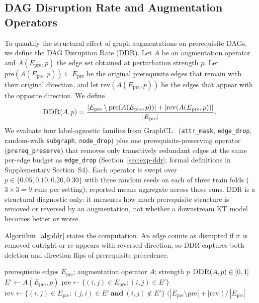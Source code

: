 \documentclass[preprint,10pt,doubleblind]{elsarticle}
\newcommand{\Epre}{\ensuremath{E_{\text{pre}}}}
\newcommand{\DDR}{\textsc{DDR}}
\begin{document}
\subsection{DAG Disruption Rate and Augmentation Operators}
\label{sec:ddr}
To quantify the structural effect of graph augmentations on prerequisite
DAGs, we define the DAG Disruption Rate (\DDR{}). Let $A$ be an
augmentation operator and $A(\Epre,p)$ the edge set obtained at
perturbation strength $p$. Let $\mathrm{pre}(A(\Epre,p))\subseteq\Epre$
be the original prerequisite edges that remain with their original
direction, and let $\mathrm{rev}(A(\Epre,p))$ be the edges that appear
with the opposite direction. We define
\begin{equation}
\DDR(A,p)=
\frac{|\Epre\setminus \mathrm{pre}(A(\Epre,p))|
      +|\mathrm{rev}(A(\Epre,p))|}
     {|\Epre|}.
\label{eq:ddr}
\end{equation}
We evaluate four label-agnostic families from GraphCL~\cite{you2020graphcl}
(\texttt{attr\_mask}, \texttt{edge\_drop}, random-walk \texttt{subgraph},
\texttt{node\_drop}) plus one prerequisite-preserving operator
(\texttt{prereq\_preserve}) that removes only transitively redundant edges at
the same per-edge budget as \texttt{edge\_drop} (Section~\ref{sec:exp-ddr};
formal definitions in Supplementary Section~S4).
Each operator is swept over $p\in\{0.05,0.10,0.20,0.30\}$ with three
random seeds on each of three train folds ($3\times 3=9$ runs per
setting); reported means aggregate across those runs. \DDR{} is a structural diagnostic only: it measures how
much prerequisite structure is removed or reversed by an augmentation,
not whether a downstream KT model becomes better or worse.

Algorithm~\ref{alg:ddr} states the computation. An edge counts as disrupted if
it is removed outright or re-appears with reversed direction, so \DDR{}
captures both deletion and direction flips of prerequisite precedence.

\begin{algorithm}[t]
\caption{DAG Disruption Rate (\DDR{})}
\label{alg:ddr}
\begin{algorithmic}[1]
\Require prerequisite edges $\Epre$; augmentation operator $A$; strength $p$
\Ensure $\DDR(A,p)\in[0,1]$
\State $E' \gets A(\Epre, p)$ 
\State $\mathrm{pre} \gets \{(i,j)\in\Epre : (i,j)\in E'\}$ 
\State $\mathrm{rev} \gets \{(i,j)\in\Epre : (j,i)\in E'\ \textbf{and}\ (i,j)\notin E'\}$ 
\State \Return $\big(|\Epre\setminus\mathrm{pre}| + |\mathrm{rev}|\big)\,/\,|\Epre|$
\end{algorithmic}
\end{algorithm}
\end{document}
